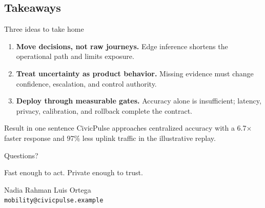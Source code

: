 \subsection{Takeaways}

\begin{frame}{Three ideas to take home}
  \begin{enumerate}
    \item \textbf{Move decisions, not raw journeys.} Edge inference shortens the operational path and limits exposure.
    \item \textbf{Treat uncertainty as product behavior.} Missing evidence must change confidence, escalation, and control authority.
    \item \textbf{Deploy through measurable gates.} Accuracy alone is insufficient; latency, privacy, calibration, and rollback complete the contract.
  \end{enumerate}

  \vfill
  \begin{exampleblock}{Result in one sentence}
    CivicPulse approaches centralized accuracy with a 6.7$\times$ faster response and 97\% less uplink traffic in the illustrative replay.
  \end{exampleblock}
\end{frame}

\begin{frame}[plain]
  \centering
  \vfill
  {\color{PulseNavy}Questions?}

  \vspace{0.45cm}
  {\large\color{PulseTeal}Fast enough to act. Private enough to trust.}

  \vspace{1.0cm}
  \small
  Nadia Rahman \textbullet{} Luis Ortega\\[0.25cm]
  \texttt{mobility@civicpulse.example}
  \vfill
\end{frame}
